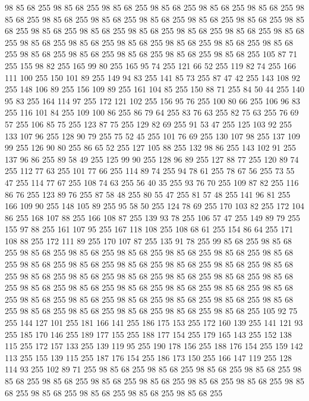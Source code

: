 98 85 68 255 98 85 68 255 98 85 68 255 98 85 68 255 98 85 68 255 98 85 68 255 98 85 68 255 98 85 68 255 98 85 68 255 98 85 68 255 98 85 68 255 98 85 68 255 98 85 68 255 98 85 68 255 98 85 68 255 98 85 68 255 98 85 68 255 98 85 68 255 98 85 68 255 98 85 68 255 98 85 68 255 98 85 68 255 98 85 68 255 98 85 68 255 98 85 68 255 98 85 68 255 98 85 68 255 98 85 68 255 98 85 68 255 98 85 68 255 105 87 71 255 155 98 82 255 165 99 80 255 165 95 74 255 121 66 52 255 119 82 74 255 166 111 100 255 150 101 89 255 149 94 83 255 141 85 73 255 87 47 42 255 143 108 92 255 148 106 89 255 156 109 89 255 161 104 85 255 150 88 71 255 84 50 44 255 140 95 83 255 164 114 97 255 172 121 102 255 156 95 76 255 100 80 66 255 106 96 83 255 116 101 84 255 109 100 86 255 86 79 64 255 83 76 63 255 82 75 63 255 76 69 57 255 106 85 75 255 123 87 75 255 129 82 69 255 91 53 47 255 125 103 92 255
133 107 96 255 128 90 79 255 75 52 45 255 101 76 69 255 130 107 98 255 137 109 99 255 126 90 80 255 86 65 52 255 127 105 88 255 132 98 86 255 143 102 91 255 137 96 86 255 89 58 49 255 125 99 90 255 128 96 89 255 127 88 77 255 120 89 74 255 112 77 63 255 101 77 66 255 114 89 74 255 94 78 61 255 78 67 56 255 73 55 47 255 114 77 67 255 108 74 63 255 56 40 35 255 93 76 70 255 109 87 82 255 116 86 76 255 123 89 76 255 87 58 48 255 80 55 47 255 81 57 48 255 141 96 81 255 166 109 90 255 148 105 89 255 95 58 50 255 124 78 69 255 170 103 82 255 172 104 86 255 168 107 88 255 166 108 87 255 139 93 78 255 106 57 47 255 149 89 79 255 155 97 88 255 161 107 95 255 167 118 108 255 108 68 61 255 154 86 64 255 171 108 88 255 172 111 89 255 170 107 87 255 135 91 78 255 99 85 68 255 98 85 68 255 98 85 68 255 98 85 68 255 98 85 68 255 98 85 68 255 98 85 68 255 98 85 68 255 98 85 68 255 98 85 68 255
98 85 68 255 98 85 68 255 98 85 68 255 98 85 68 255 98 85 68 255 98 85 68 255 98 85 68 255 98 85 68 255 98 85 68 255 98 85 68 255 98 85 68 255 98 85 68 255 98 85 68 255 98 85 68 255 98 85 68 255 98 85 68 255 98 85 68 255 98 85 68 255 98 85 68 255 98 85 68 255 98 85 68 255 98 85 68 255 98 85 68 255 98 85 68 255 98 85 68 255 98 85 68 255 98 85 68 255 105 92 75 255 144 127 101 255 181 166 141 255 186 175 153 255 172 160 139 255 141 121 93 255 185 170 146 255 189 177 155 255 188 177 154 255 179 165 143 255 152 138 115 255 172 157 133 255 139 119 95 255 190 178 156 255 188 176 154 255 159 142 113 255 155 139 115 255 187 176 154 255 186 173 150 255 166 147 119 255 128 114 93 255 102 89 71 255 98 85 68 255 98 85 68 255 98 85 68 255 98 85 68 255 98 85 68 255 98 85 68 255 98 85 68 255 98 85 68 255 98 85 68 255 98 85 68 255 98 85 68 255 98 85 68 255 98 85 68 255 98 85 68 255 98 85 68 255
